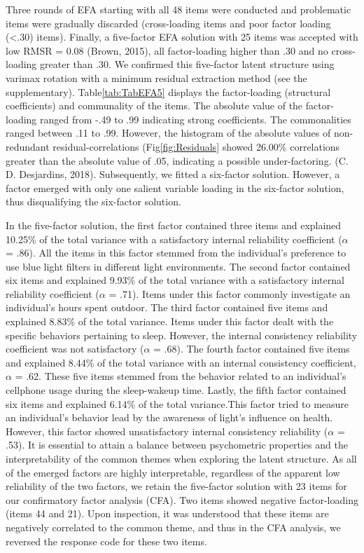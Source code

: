 \documentclass[
  english,
  man]{apa6}
\begin{document}
Three rounds of EFA starting with all 48 items were conducted and problematic items were gradually discarded (cross-loading items and poor factor loading (\textless.30) items). Finally, a five-factor EFA solution with 25 items was accepted with low RMSR = 0.08 (Brown, 2015), all factor-loading higher than .30 and no cross-loading greater than .30. We confirmed this five-factor latent structure using varimax rotation with a minimum residual extraction method (see the supplementary). Table\ref{tab:TabEFA5} displays the factor-loading (structural coefficients) and communality of the items. The absolute value of the factor-loading ranged from -.49 to .99 indicating strong coefficients. The commonalities ranged between .11 to .99. However, the histogram of the absolute values of non-redundant residual-correlations (Fig\ref{fig:Residuals} showed 26.00\% correlations greater than the absolute value of .05, indicating a possible under-factoring. (C. D. Desjardins, 2018). Subsequently, we fitted a six-factor solution. However, a factor emerged with only one salient variable loading in the six-factor solution, thus disqualifying the six-factor solution.

In the five-factor solution, the first factor contained three items and explained 10.25\% of the total variance with a satisfactory internal reliability coefficient (\(\alpha\) = .86). All the items in this factor stemmed from the individual's preference to use blue light filters in different light environments. The second factor contained six items and explained 9.93\% of the total variance with a satisfactory internal reliability coefficient (\(\alpha\) = .71). Items under this factor commonly investigate an individual's hours spent outdoor. The third factor contained five items and explained 8.83\% of the total variance. Items under this factor dealt with the specific behaviors pertaining to sleep. However, the internal consistency reliability coefficient was not satisfactory (\(\alpha\) = .68). The fourth factor contained five items and explained 8.44\% of the total variance with an internal consistency coefficient, \(\alpha\) = .62. These five items stemmed from the behavior related to an individual's cellphone usage during the sleep-wakeup time. Lastly, the fifth factor contained six items and explained 6.14\% of the total variance.This factor tried to measure an individual's behavior lead by the awareness of light's influence on health. However, this factor showed unsatisfactory internal consistency reliability (\(\alpha\) = .53). It is essential to attain a balance between psychometric properties and the interpretability of the common themes when exploring the latent structure. As all of the emerged factors are highly interpretable, regardless of the apparent low reliability of the two factors, we retain the five-factor solution with 23 items for our confirmatory factor analysis (CFA). Two items showed negative factor-loading (items 44 and 21). Upon inspection, it was understood that these items are negatively correlated to the common theme, and thus in the CFA analysis, we reversed the response code for these two items.
\end{document}
